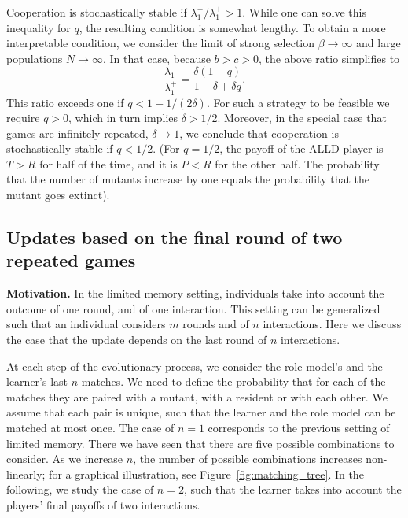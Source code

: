 \documentclass[11pt]{article}
\theoremstyle{plainCl1}
\theoremstyle{plainCl2}
\begin{document}
Cooperation is stochastically stable if $\lambda^-_1/\lambda^+_1\!>\!1$. 
While one can solve this inequality for $q$, the resulting condition is somewhat lengthy.  
To obtain a more interpretable condition, we consider the limit of strong selection \(\beta\! \rightarrow\! \infty\) and
large populations \(N \!\rightarrow \!\infty \). In that case, because $b\!>\!c\!>\!0$, the above ratio simplifies to
\begin{equation} \label{Eq:TransitionRatioSimple}
    \frac{\lambda^{-}_1}{\lambda^{+}_1} = \frac{\delta(1 - q)}{1 - \delta + \delta q}.
\end{equation}
This ratio exceeds one if  \(q <1 \!-\! 1/(2 \delta)\). 
For such a strategy to be feasible we require $q\!>\!0$, which in turn implies $\delta\!>\!1/2$. 
Moreover, in the special case that games are infinitely repeated, \(\delta\! \rightarrow\! 1\), we conclude that cooperation is stochastically stable if  \(q \!<\! 1/2\). 
(For \(q\! =\! 1/2\), the payoff of the ALLD player is
\(T \!>\! R\) for half of the time, and it is \(P\! < \! R\) for the other half. The
probability that the number of mutants increase by one equals the probability
that the mutant goes extinct).



\subsection{Updates based on the final round of two repeated games} 
\label{section:m_one_n_two}


{\bf Motivation.} 
In the limited memory setting, individuals take into account the outcome of one round, and of one interaction. 
This setting can be generalized such that an individual
considers \(m\) rounds and of \(n\) interactions. Here we discuss the case that
the update depends on the last round of \(n\) interactions.

At each step of the evolutionary process, we consider the role model's and the learner's last \(n\) matches. 
We need to define the probability that for each of
the matches they are paired with a mutant, with a resident or with each other.
We assume that each pair is unique, such that the learner and the role model
can be matched at most once. 
The case of \(n\!=\!1\) corresponds to the previous setting of limited memory. 
There we have seen that there are five possible combinations to consider. 
As we increase $n$, the number of possible combinations increases non-linearly; 
for a graphical illustration, see Figure~\ref{fig:matching_tree}. 
In the following, we study the case of \(n=2\), such that the learner takes into account the players' final payoffs of two interactions.\\
\end{document}
